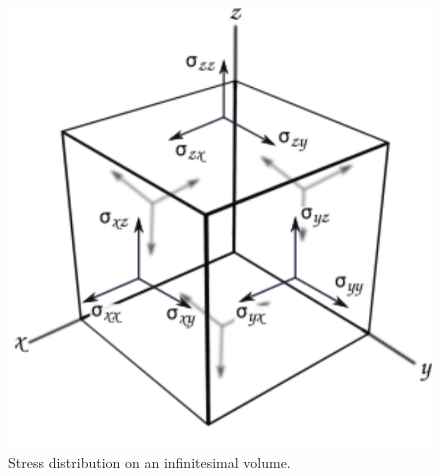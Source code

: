 \begin{figure}[ht]
    \centering
    \includegraphics[width=0.42\linewidth]{Figures/cubefin.png}
    \caption{Stress distribution on an infinitesimal volume.}
    \label{fig:stress}
\end{figure}

